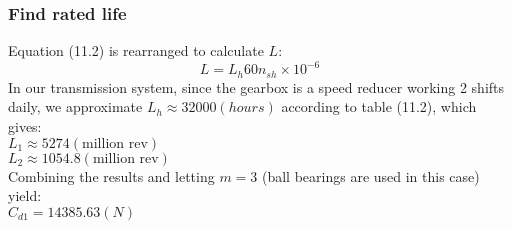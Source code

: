 \subsubsection{Find rated life}
Equation (11.2) is rearranged to calculate $ L $:
\[L = L_h60n_{sh}\times10^{-6}\]
In our transmission system, since the gearbox is a speed reducer working 2 shifts daily, we approximate $ L_h \approx 32000 \unit{(hours)}$ according to table (11.2), which gives:\\
$ L_1 \approx 5274 \unit{(\text{million rev})} $\\
$ L_2 \approx 1054.8 \unit{(\text{million rev})} $\\
Combining the results and letting $ m=3 $ (ball bearings are used in this case) yield:\\
$ C_{d1} = 14385.63 \unit{(N)} $